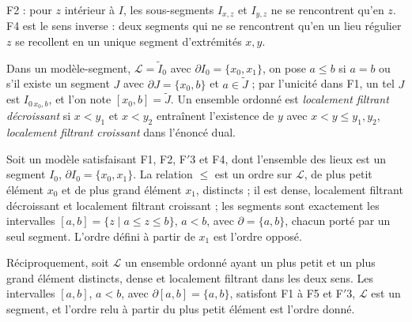 \begin{center}
\end{center}
{\small F2 : pour $z$ intérieur à $I$, les sous-segments $I_{x,z}$ et $I_{y,z}$ ne se rencontrent qu'en $z$. F4 est le sens inverse : deux segments qui ne se rencontrent qu'en un lieu régulier $z$ se recollent en un unique segment d'extrémités $x, y$.\par}
\medskip
Dans un modèle-segment, $\mathcal L = \widetilde I_0$ avec $\partial I_0 = \{x_0, x_1\}$, on pose $a \leq b$ si $a = b$ ou s'il existe un segment $J$ avec $\partial J = \{x_0, b\}$ et $a \in \widetilde J$ ; par l'unicité dans F1, un tel $J$ est $I_{0\,x_0,b}$, et l'on note $[x_0,b] = \widetilde J$. Un ensemble ordonné est \emph{localement filtrant décroissant} si $x < y_1$ et $x < y_2$ entraînent l'existence de $y$ avec $x < y \leq y_1, y_2$, \emph{localement filtrant croissant} dans l'énoncé dual.

\begin{encadre}
\begin{theoreme}
Soit un modèle satisfaisant F1, F2, F$'$3 et F4, dont l'ensemble des lieux est un segment $I_0$, $\partial I_0 = \{x_0, x_1\}$. La relation $\leq$ est un ordre sur $\mathcal L$, de plus petit élément $x_0$ et de plus grand élément $x_1$, distincts ; il est dense, localement filtrant décroissant et localement filtrant croissant ; les segments sont exactement les intervalles $[a,b] = \{z \mid a \leq z \leq b\}$, $a < b$, avec $\partial = \{a,b\}$, chacun porté par un seul segment. L'ordre défini à partir de $x_1$ est l'ordre opposé.

Réciproquement, soit $\mathcal L$ un ensemble ordonné ayant un plus petit et un plus grand élément distincts, dense et localement filtrant dans les deux sens. Les intervalles $[a,b]$, $a<b$, avec $\partial [a,b] = \{a,b\}$, satisfont F1 à F5 et F$'$3, $\mathcal L$ est un segment, et l'ordre relu à partir du plus petit élément est l'ordre donné.
\end{theoreme}
\end{encadre}

